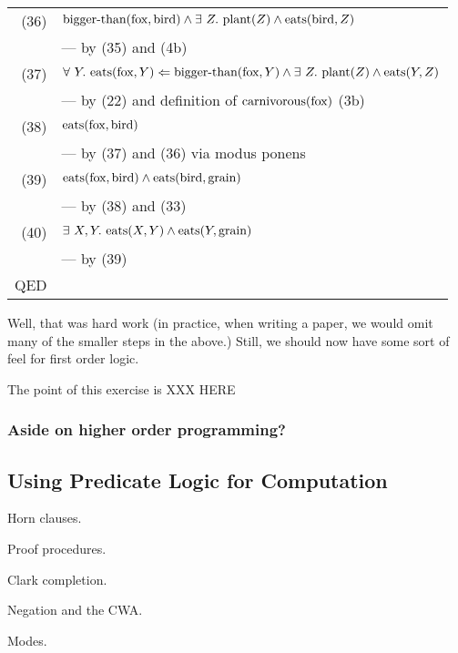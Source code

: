 \begin{tabular}{rl}
(36) & $\text{bigger-than}(\text{fox}, \text{bird}) \wedge
        \exists\ Z.\ \text{plant}(Z) \wedge \text{eats}(\text{bird}, Z)$
\\ & --- by (35) and (4b) \\
(37) & $\forall\ Y.\ \text{eats}(\text{fox}, Y) \Leftarrow
            \text{bigger-than}(\text{fox}, Y) \wedge
            \exists\ Z.\ \text{plant}(Z) \wedge \text{eats}(Y, Z)$
\\ & --- by (22) and definition of $\text{carnivorous}(\text{fox})$ (3b) \\
(38) & $\text{eats}(\text{fox}, \text{bird})$
\\ & --- by (37) and (36) via modus ponens \\
(39) & $\text{eats}(\text{fox}, \text{bird}) \wedge \text{eats}(\text{bird}, \text{grain})$
\\ & --- by (38) and (33) \\
(40) & $\exists\ X, Y.\ \text{eats}(X, Y) \wedge \text{eats}(Y, \text{grain})$
\\ & --- by (39) \\
QED \\
\end{tabular}

Well, that was hard work (in practice, when writing a paper, we would
omit many of the smaller steps in the above.)  Still, we should now have
some sort of feel for first order logic.

The point of this exercise is XXX HERE

\subsubsection{Aside on higher order programming?}


\subsection{Using Predicate Logic for Computation}

Horn clauses.

Proof procedures.

Clark completion.

Negation and the CWA.

Modes.



